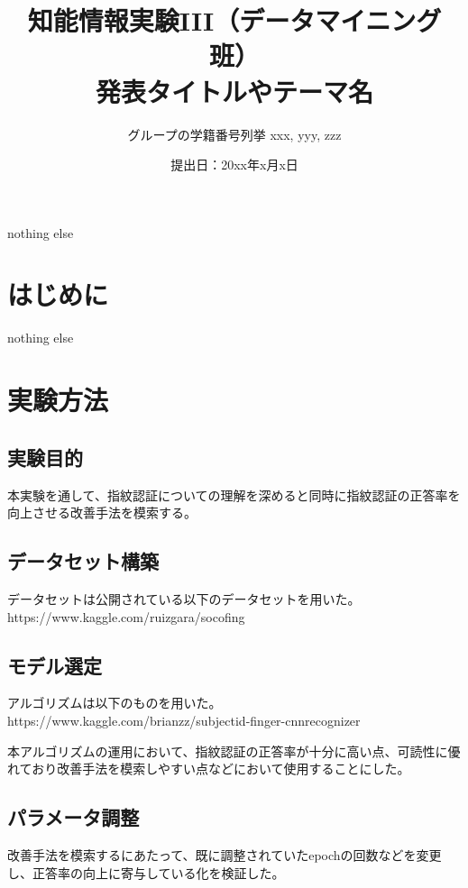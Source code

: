 \documentclass[a4paper, 11pt, titlepage]{jsarticle}
\title{知能情報実験III（データマイニング班）\\発表タイトルやテーマ名}
\author{グループの学籍番号列挙 xxx, yyy, zzz}
\date{提出日：20xx年x月x日}
\begin{document}
\maketitle
\tableofcontents
\clearpage

nothing else

\section{はじめに}%
nothing else
\section{実験方法}%

\subsection{実験目的}
本実験を通して、指紋認証についての理解を深めると同時に指紋認証の正答率を向上させる改善手法を模索する。

\subsection{データセット構築}
データセットは公開されている以下のデータセットを用いた。\\
https://www.kaggle.com/ruizgara/socofing


\subsection{モデル選定}
アルゴリズムは以下のものを用いた。\\
https://www.kaggle.com/brianzz/subjectid-finger-cnnrecognizer

本アルゴリズムの運用において、指紋認証の正答率が十分に高い点、可読性に優れており改善手法を模索しやすい点などにおいて使用することにした。%


\subsection{パラメータ調整}
改善手法を模索するにあたって、既に調整されていたepochの回数などを変更し、正答率の向上に寄与している化を検証した。
\end{document}
